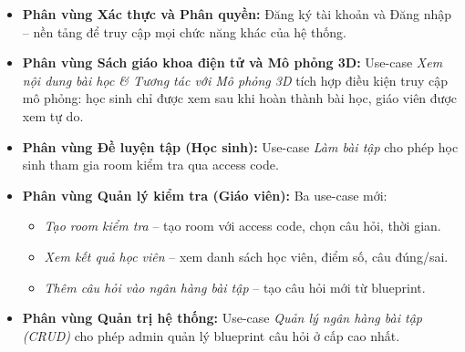 \begin{itemize}
    \item \textbf{Phân vùng Xác thực và Phân quyền:} Đăng ký tài khoản và Đăng nhập – nền tảng để truy cập mọi chức năng khác của hệ thống.
    
    \item \textbf{Phân vùng Sách giáo khoa điện tử và Mô phỏng 3D:} Use-case \textit{Xem nội dung bài học \& Tương tác với Mô phỏng 3D} tích hợp điều kiện truy cập mô phỏng: học sinh chỉ được xem sau khi hoàn thành bài học, giáo viên được xem tự do.
    
    \item \textbf{Phân vùng Đề luyện tập (Học sinh):} Use-case \textit{Làm bài tập} cho phép học sinh tham gia room kiểm tra qua access code.
    
    \item \textbf{Phân vùng Quản lý kiểm tra (Giáo viên):} Ba use-case mới:
    \begin{itemize}
        \item \textit{Tạo room kiểm tra} – tạo room với access code, chọn câu hỏi, thời gian.
        \item \textit{Xem kết quả học viên} – xem danh sách học viên, điểm số, câu đúng/sai.
        \item \textit{Thêm câu hỏi vào ngân hàng bài tập} – tạo câu hỏi mới từ blueprint.
    \end{itemize}
    
    \item \textbf{Phân vùng Quản trị hệ thống:} Use-case \textit{Quản lý ngân hàng bài tập (CRUD)} cho phép admin quản lý blueprint câu hỏi ở cấp cao nhất.
\end{itemize}